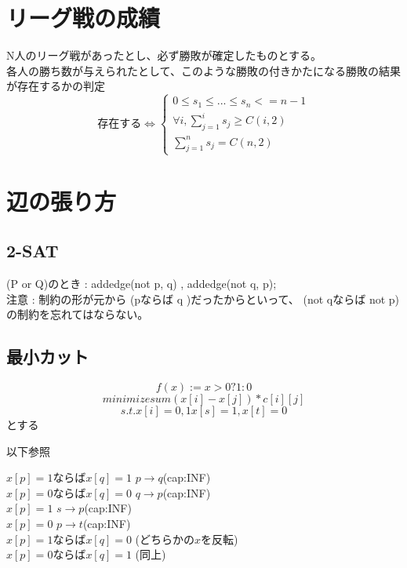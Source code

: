 \section{リーグ戦の成績}
N人のリーグ戦があったとし、必ず勝敗が確定したものとする。\\
各人の勝ち数が与えられたとして、このような勝敗の付きかたになる勝敗の結果が存在するかの判定\\

\[存在する \Leftrightarrow \begin{cases}
0 \leq s_1 \leq ... \leq s_n <= n-1 \\
\forall i, \sum_{j=1}^{i} s_j \geq C(i,2) \\
\sum_{j=1}^{n} s_j = C(n,2)
\end{cases} \]


\section{辺の張り方}

\subsection{2-SAT}
(P or Q)のとき : addedge(not p, q) , addedge(not q, p); \\

注意 : 制約の形が元から (pならば q )だったからといって、
(not qならば not p)の制約を忘れてはならない。


\subsection{最小カット}
\[f(x) := x>0 ? 1 : 0\]
\[minimize sum(x[i] - x[j]) * c[i][j]\]
\[s.t. x[i]=0,1 x[s]=1, x[t]=0\]
とする

以下参照

$x[p]=1$ならば$x[q]=1$  $p \rightarrow q$(cap:INF)\\
$x[p]=0$ならば$x[q]=0$	$q \rightarrow p$(cap:INF)\\
$x[p]=1$ $s \rightarrow p$(cap:INF)\\
$x[p]=0$ $p \rightarrow t$(cap:INF)\\
$x[p]=1$ならば$x[q]=0$	(どちらかの$x$を反転)\\
$x[p]=0$ならば$x[q]=1$	(同上)\\
